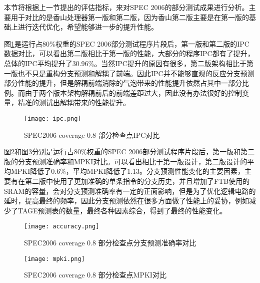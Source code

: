 本节将根据上一节提出的评估指标，来对SPEC 2006的部分测试成果进行分析。主要用于对比的是香山处理器第一版和第二版，因为香山第二版主要是在第一版的基础上进行迭代优化，希望能够进一步的提升性能。

图\ref{fig:figure61}是运行占80\%权重的SPEC 2006部分测试程序片段后，第一版和第二版的IPC数据对比，可以看出第二版相比于第一版的性能，大部分的程序IPC都有了提升，总体的IPC平均提升了30.96\%。当然IPC提升的原因有很多，第二版架构相比于第一版也不只是重构分支预测和解耦了前端。因此IPC并不能够直观的反应分支预测部分性能的提升，但是解耦前端消除的气泡带来的性能提升依然占其中一部分比例。而由于两个版本架构解耦前后的前端差距过大，因此没有办法很好的控制变量，精准的测试出解耦带来的性能提升。


\begin{figure}[htb]
	\centering
	\setlength\tabcolsep{3pt}  %
	\vspace{5pt} %
	\texttt{[image: ipc.png]}
	\caption{SPEC2006 coverage 0.8 部分检查点IPC对比}
	\label{fig:figure61}
\end{figure}

图\ref{fig:figure64}和图\ref{fig:figure62}分别是运行占80\%权重的SPEC 2006部分测试程序片段后，第一版和第二版的分支预测准确率和MPKI对比。可以看出相比于第一版设计，第二版设计的平均MPKI降低了0.6\%，平均MPKI降低了1.13。分支预测性能变化的主要因素，主要有在第二版中使用了更加准确的单条指令的分支历史，并且增加了FTB使用的SRAM的容量，会对分支预测准确率有一定的正面影响，但是为了优化逻辑电路的延时，提高最终的频率，因此分支预测依然在很多方面做了性能上的妥协，例如减少了TAGE预测表的数量，最终各种因素综合，得到了最终的性能变化。

\begin{figure}[htb]
	\centering
	\setlength\tabcolsep{3pt}  %
	\vspace{5pt} %
	\texttt{[image: accuracy.png]}
	\caption{SPEC2006 coverage 0.8 部分检查点分支预测准确率对比}
	\label{fig:figure64}
\end{figure}



\begin{figure}[htb]
	\centering
	\setlength\tabcolsep{3pt}  %
	\vspace{5pt} %
	\texttt{[image: mpki.png]}
	\caption{SPEC2006 coverage 0.8 部分检查点MPKI对比}
	\label{fig:figure62}
\end{figure}

